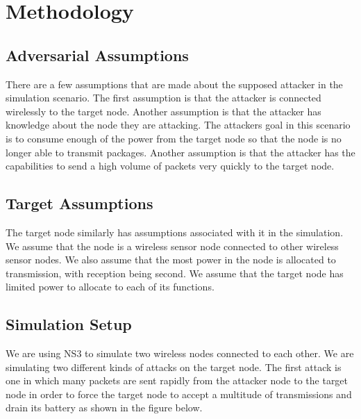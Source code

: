 \section{Methodology}
\subsection{Adversarial Assumptions}
There are a few assumptions that are made about the supposed attacker in the simulation scenario.  The first assumption is that the attacker is connected wirelessly to the target node. Another assumption is that the attacker has knowledge about the node they are attacking. The attackers goal in this scenario is to consume enough of the power from the target node so that the node is no longer able to transmit packages.  Another assumption is that the attacker has the capabilities to send a high volume of packets very quickly to the target node.
\subsection{Target Assumptions}
The target node similarly has assumptions associated with it in the simulation.  We assume that the node is a wireless sensor node connected to other wireless sensor nodes.  We also assume that the most power in the node is allocated to transmission, with reception being second.  We assume that the target node has limited power to allocate to each of its functions.
\subsection{Simulation Setup}
We are using NS3 to simulate two wireless nodes connected to each other. We are simulating two different kinds of attacks on the target node. The first attack is one in which many packets are sent rapidly from the attacker node to the target node in order to force the target node to accept a multitude of transmissions and drain its battery as shown in the figure below. 

